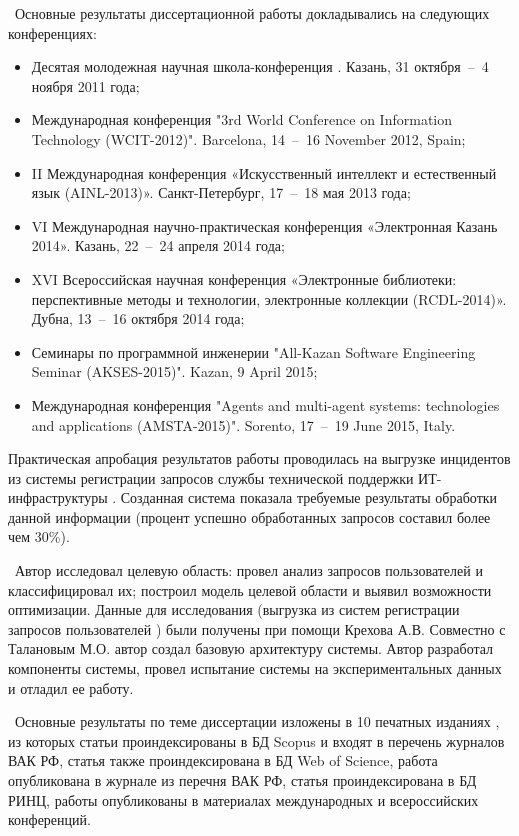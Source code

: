 \probation\
 Основные результаты диссертационной работы докладывались на следующих конференциях:
\begin{itemize}
	\item Десятая молодежная научная школа-конференция . Казань, 31 октября~--~4 ноября 2011 года;
	\item Международная конференция "3rd World Conference on Information Technology (WCIT-2012)". Barcelona, 14~--~16 November 2012, Spain; 
	\item II Международная конференция «Искусственный интеллект и естественный язык (AINL-2013)». Санкт-Петербург, 17~--~18 мая 2013 года;
	\item VI Международная научно-практическая конференция «Электронная Казань 2014». Казань, 22~--~24 апреля 2014 года;
	\item XVI Всероссийская научная конференция «Электронные библиотеки: перспективные методы и технологии, электронные коллекции (RCDL-2014)». Дубна, 13~--~16 октября 2014 года;
	\item Семинары по программной инженерии "All-Kazan Software Engineering Seminar (AKSES-2015)". Kazan, 9 April 2015;
	\item Международная конференция "Agents and multi-agent systems: technologies and applications (AMSTA-2015)". Sorento, 17~--~19 June 2015, Italy.
\end{itemize} \par
Практическая апробация результатов работы проводилась на выгрузке инцидентов из системы регистрации запросов службы технической поддержки ИТ-инфраструктуры \icl. Созданная система показала требуемые результаты обработки данной информации (процент успешно обработанных запросов составил более чем 30\%). \par
\contribution\ Автор исследовал целевую область: провел анализ запросов пользователей и классифицировал их; построил модель целевой области и выявил возможности оптимизации. Данные для исследования (выгрузка из систем регистрации запросов пользователей \iclshort) были получены при помощи Крехова А.В.  Совместно с Талановым М.О. автор создал базовую архитектуру системы. Автор разработал компоненты системы, провел испытание системы на экспериментальных данных и отладил ее работу. \par
\publications\ Основные результаты по теме диссертации изложены в 10 печатных изданиях  \cite{Lobachevskii, WCIT-2012,  ISGZ, IJSE-1, IJSE-2, RCDL-2014, AMSTA-2015, VAK-1, EB-1, EB-2}, из которых статьи \cite{RCDL-2014, AMSTA-2015} проиндексированы в БД Scopus и входят в перечень журналов ВАК РФ, статья \cite{AMSTA-2015} также проиндексирована в БД Web of Science, работа \cite{VAK-1} опубликована в журнале из перечня ВАК РФ, статья \cite{ISGZ} проиндексирована в БД РИНЦ, работы \cite{Lobachevskii, WCIT-2012, ISGZ} опубликованы в материалах международных и всероссийских конференций.



